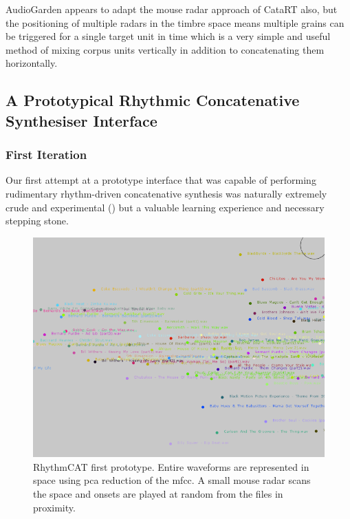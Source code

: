 AudioGarden appears to adapt the mouse radar approach of CataRT also, but the positioning of multiple radars in the timbre space means multiple grains can be triggered for a single target unit in time which is a very simple and useful method of mixing corpus units vertically in addition to concatenating them horizontally.

\subsection{A Prototypical Rhythmic Concatenative Synthesiser Interface}

\subsubsection{First Iteration}

Our first attempt at a prototype interface that was capable of performing rudimentary rhythm-driven concatenative synthesis was naturally extremely crude and experimental () but a valuable learning experience and necessary stepping stone.

\begin{figure}
	\begin{center}
		\includegraphics[width=1.0\textwidth]{ch06_rhythmcat/figures/rhythmcat_proto1.png}
	\end{center}
	\caption[RhythmCAT first prototype]{RhythmCAT first prototype. Entire waveforms are represented in space using \acrshort{pca} reduction of the \acrshort{mfcc}. A small mouse radar scans the space and onsets are played at random from the files in proximity.}
	\label{fig:rhythmcat_proto1}
\end{figure}

